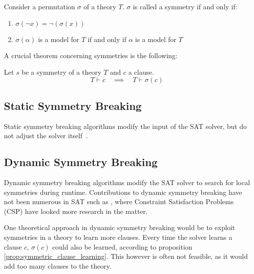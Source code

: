 

		Consider a permutation $\sigma$ of a theory $T$.
		$\sigma$ is called a symmetry if and only if:

		\begin{enumerate}
			\item $\sigma(\neg x) = \neg(\sigma( x ))$
			\item $\sigma(\alpha )$ is a model for $T$ if and only if $\alpha$ is a model for
				$T$
		\end{enumerate}

		A crucial theorem concerning symmetries is the following: \\

		\begin{proposition}
			\label{prop:symmetric_clause_learning}
			Let $s$ be a symmetry of a theory $T$ and $c$ a clause.
			\begin{equation}
				T \vdash c \quad \implies \quad T \vdash \sigma( c )
			\end{equation}
		\end{proposition}

\subsection{Static Symmetry Breaking}
	Static symmetry breaking algorithms modify the input of the SAT solver, but do not
	adjust the solver itself~\cite{sakallah2009symmetry}.

\subsection{Dynamic Symmetry Breaking}
	Dynamic symmetry breaking algorithms modify the SAT solver to search for local
	symmetries during runtime. Contributions to dynamic symmetry breaking have not been
	numerous in SAT such as \cite{sabharwal2005symchaff}, where Constraint Satisfaction
	Problems (CSP) have looked more research in the matter.

	One theoretical approach in dynamic symmetry breaking would be to exploit symmetries in
	a theory to learn more clauses.
	Every time the solver learns a clause $c$, $\sigma(c)$ could also be learned, according
	to proposition \ref{prop:symmetric_clause_learning}.
	This however is often not feasible, as it would add too many clauses to the theory.

